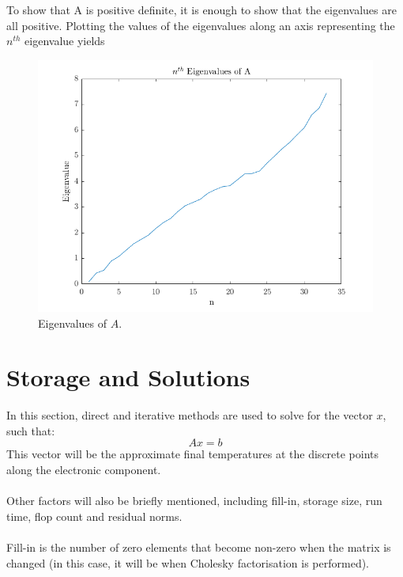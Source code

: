 \documentclass[12pt,a4paper]{article}
\begin{document}
\\\\To show that A is positive definite, it is enough to show that the eigenvalues are all positive. Plotting the values of the eigenvalues along an axis representing the $n^{th}$ eigenvalue yields\begin{figure}[H]
	\includegraphics[width=\linewidth]{images/eigenvaluePlot.png}
	\caption{Eigenvalues of $A$.}
	\label{fig:eigenvalues}
\end{figure}

\section{Storage and Solutions}
In this section, direct and iterative methods are used to solve for the vector $x$, such that:
\[Ax=b\]
This vector will be the approximate final temperatures at the discrete points along the electronic component. \\\\Other factors will also be briefly mentioned, including fill-in, storage size, run time, flop count and residual norms.\\\\Fill-in is the number of zero elements that become non-zero when the matrix is changed (in this case, it will be when Cholesky factorisation is performed).
\end{document}
